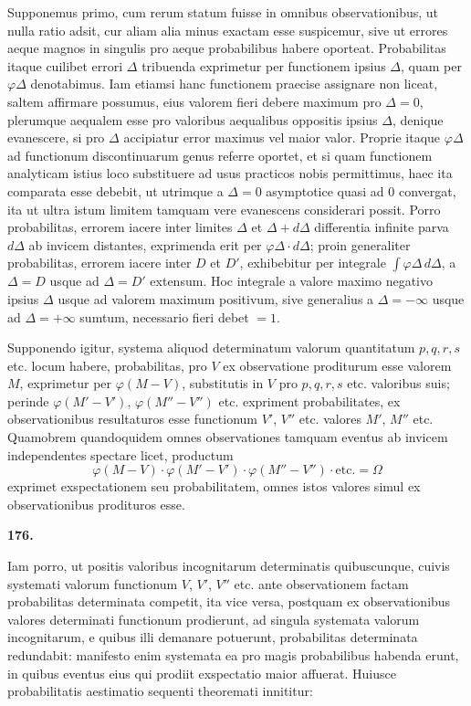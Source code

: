 \documentclass[11pt,a4paper]{article}
\begin{document}
Supponemus primo, cum rerum statum fuisse in omnibus observationibus, ut nulla ratio adsit, cur aliam alia minus exactam esse suspicemur, sive ut errores aeque magnos in singulis pro aeque probabilibus habere oporteat. Probabilitas itaque cuilibet errori $\Delta$ tribuenda exprimetur per functionem ipsius $\Delta$, quam per $\varphi\Delta$ denotabimus. Iam etiamsi hanc functionem praecise assignare non liceat, saltem affirmare possumus, eius valorem fieri debere maximum pro $\Delta = 0$, plerumque aequalem esse pro valoribus aequalibus oppositis ipsius $\Delta$, denique evanescere, si pro $\Delta$ accipiatur error maximus vel maior valor. Proprie itaque $\varphi\Delta$ ad functionum discontinuarum genus referre oportet, et si quam functionem analyticam istius loco substituere ad usus practicos nobis permittimus, haec ita comparata esse debebit, ut utrimque a $\Delta = 0$ asymptotice quasi ad $0$ convergat, ita ut ultra istum limitem tamquam vere evanescens considerari possit. Porro probabilitas, errorem iacere inter limites $\Delta$ et $\Delta+d\Delta$ differentia infinite parva $d\Delta$ ab invicem distantes, exprimenda erit per $\varphi\Delta \cdot d\Delta$; proin generaliter probabilitas, errorem iacere inter $D$ et $D'$, exhibebitur per integrale $\int \varphi\Delta \, d\Delta$, a $\Delta = D$ usque ad $\Delta = D'$ extensum. Hoc integrale a valore maximo negativo ipsius $\Delta$ usque ad valorem maximum positivum, sive generalius a $\Delta = -\infty$ usque ad $\Delta = +\infty$ sumtum, necessario fieri debet $= 1$.

Supponendo igitur, systema aliquod determinatum valorum quantitatum $p, q, r, s$ etc.
locum habere, probabilitas, pro $V$ ex observatione proditurum esse valorem $M$, exprimetur per $\varphi(M-V)$, substitutis in $V$ pro $p, q, r, s$ etc.
valoribus suis; perinde $\varphi(M'-V')$, $\varphi(M''-V'')$ etc. expriment probabilitates, ex observationibus resultaturos esse functionum $V'$, $V''$ etc. valores $M'$, $M''$ etc. Quamobrem quandoquidem omnes observationes tamquam eventus ab invicem independentes spectare licet, productum
\[
\varphi(M-V) \cdot \varphi(M'-V') \cdot \varphi(M''-V'') \cdot \text{etc.} = \Omega
\]
exprimet exspectationem seu probabilitatem, omnes istos valores simul ex observationibus prodituros esse.

\vspace{1em}

\noindent\textbf{176.}

Iam porro, ut positis valoribus incognitarum determinatis quibuscunque, cuivis systemati valorum functionum $V$, $V'$, $V''$ etc. ante observationem factam probabilitas determinata competit, ita vice versa, postquam ex observationibus valores determinati functionum prodierunt, ad singula systemata valorum incognitarum, e quibus illi demanare potuerunt, probabilitas determinata redundabit: manifesto enim systemata ea pro magis probabilibus habenda erunt, in quibus eventus eius qui prodiit exspectatio maior affuerat. Huiusce probabilitatis aestimatio sequenti theoremati innititur:
\end{document}
